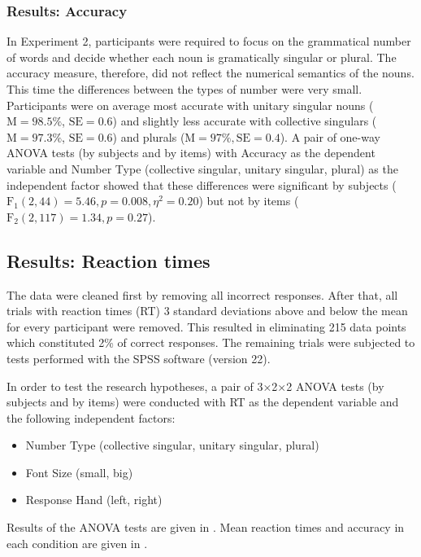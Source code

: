 \documentclass[output=paper]{langscibook}
\begin{document}
\subsubsection{Results: Accuracy}
In Experiment 2, participants were required to focus on the grammatical number of words and decide whether each noun is gramatically singular or plural. The accuracy measure, therefore, did not reflect the numerical semantics of the nouns. This time the differences between the types of number were very small. Participants were on average most accurate with unitary singular nouns ($\text{M}=98.5\%$, $\text{SE}=0.6$) and slightly less accurate with collective singulars ($\text{M}=97.3\%$, $\text{SE}=0.6$) and plurals ($\text{M}=97\%, \text{SE}=0.4$). A pair of one-way ANOVA tests (by subjects and by items) with Accuracy as the dependent variable and Number Type (collective singular, unitary singular, plural) as the independent factor showed that these differences were significant by subjects ($\text{F}_{1}(2,44)=5.46, p=0.008, \eta^2=0.20$) but not by items ($\text{F}_{2}(2,117)=1.34, p=0.27$).

\subsection{Results: Reaction times}
The data were cleaned first by removing all incorrect responses. After that, all trials with reaction times (RT) 3 standard deviations above and below the mean for every participant were removed. This resulted in eliminating 215 data points which constituted 2\% of correct responses. The remaining trials were subjected to tests performed with the SPSS software (version 22).

In order to test the research hypotheses, a pair of 3×2×2 ANOVA tests (by subjects and by items) were conducted with RT as the dependent variable and the following independent factors:

\begin{itemize}
\item Number Type (collective singular, unitary singular, plural)
\item Font Size (small, big)
\item Response Hand (left, right)
\end{itemize}

Results of the ANOVA tests are given in . Mean reaction times and accuracy in each condition are given in .
\end{document}
